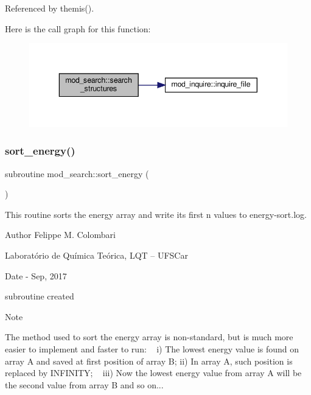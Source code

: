 Referenced by themis().

Here is the call graph for this function\+:
\nopagebreak
\begin{figure}[H]
\begin{center}
\leavevmode
\includegraphics[width=343pt]{namespacemod__search_ac11978e9ebdb6b101a09555f4742a4c9_cgraph}
\end{center}
\end{figure}
\mbox{\label{namespacemod__search_a55e1f850472fe6cef190a6838ae61e51}} 
\subsubsection{\texorpdfstring{sort\+\_\+energy()}{sort\_energy()}}
{\footnotesize\ttfamily subroutine mod\+\_\+search\+::sort\+\_\+energy (\begin{DoxyParamCaption}{ }\end{DoxyParamCaption})}



This routine sorts the energy array and write its first n values to energy-\/sort.\+log. 

\begin{DoxyAuthor}{Author}
Felippe M. Colombari
\begin{DoxyItemize}
\item Laboratório de Química Teórica, L\+QT -- U\+F\+S\+Car 
\end{DoxyItemize}
\end{DoxyAuthor}
\begin{DoxyDate}{Date}
-\/ Sep, 2017
\begin{DoxyItemize}
\item subroutine created 
\end{DoxyItemize}
\end{DoxyDate}
\begin{DoxyNote}{Note}
~\newline

\begin{DoxyItemize}
\item The method used to sort the energy array is non-\/standard, but is much more easier to implement and faster to run\+: ~\newline
 i) The lowest energy value is found on array A and saved at first position of array B; ii) In array A, such position is replaced by I\+N\+F\+I\+N\+I\+TY; ~\newline
 iii) Now the lowest energy value from array A will be the second value from array B and so on... 
\end{DoxyItemize}
\end{DoxyNote}


